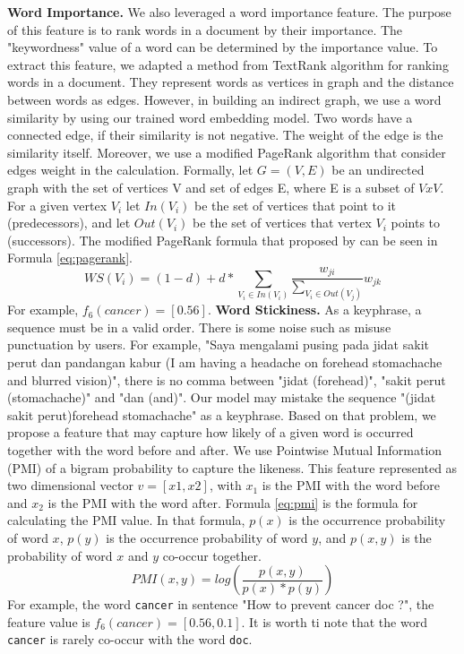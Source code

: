     \textbf{Word Importance.} We also leveraged a word importance feature. The purpose of this feature is to rank words in a document by their importance. The "keywordness" value of a word can be determined by the importance value. To extract this feature, we adapted a method from TextRank \cite{mihalcea2004textrank} algorithm for ranking words in a document. They represent words as vertices in graph and the distance between words as edges. However, in building an indirect graph, we use a word similarity by using our trained word embedding model. Two words have a connected edge, if their similarity is not negative. The weight of the edge is the similarity itself. Moreover, we use a modified PageRank \cite{page1999pagerank} algorithm that consider edges weight in the calculation. Formally, let $G = (V, E)$ be an undirected graph with the set of vertices V and set of edges E, where E is a subset of $VxV$. For a given vertex $V_i$ let $In(V_i)$ be the set of vertices that point to it (predecessors), and let $Out(V_i)$ be the set of vertices that vertex $V_i$ points to (successors). The modified PageRank formula that proposed by \cite{mihalcea2004textrank} can be seen in Formula \ref{eq:pagerank}.
        \begin{equation}\label{eq:pagerank}
        	WS(V_{i})=(1-d) + d * \sum_{V_{i} \in In(V_{i})} \frac{w_{ji}}{\sum_{V_{i} \in Out(V_{j})}}w_{jk}
        \end{equation}
    For example, $f_6(cancer) = [0.56]$.
    \textbf{Word Stickiness.} As a keyphrase, a sequence must be in a valid order. There is some noise such as misuse punctuation by users. For example, "Saya mengalami pusing pada jidat sakit perut dan pandangan kabur (I am having a headache on forehead stomachache and blurred vision)", there is no comma between "jidat (forehead)", "sakit perut (stomachache)" and "dan (and)". Our model may mistake the sequence "(jidat sakit perut)forehead stomachache" as a keyphrase. Based on that problem, we propose a feature that may capture how likely of a given word is occurred together with the word before and after. We use Pointwise Mutual Information (PMI) of a bigram probability to capture the likeness. This feature represented as two dimensional vector $v = [x1, x2]$, with $x_1$ is the PMI with the word before and $x_2$ is the PMI with the word after. Formula \ref{eq:pmi} is the formula for calculating the PMI value. In that formula, $p(x)$ is the occurrence probability of word $x$, $p(y)$ is the occurrence probability of word $y$, and $p(x, y)$ is the probability of word $x$ and $y$ co-occur together.
    \begin{equation}\label{eq:pmi}
	    PMI(x,y)=log(\frac{p(x, y)}{p(x)*p(y)})
    \end{equation}
    For example, the word \texttt{cancer} in sentence "How to prevent cancer doc ?", the feature value is $f_6(cancer) = [0.56, 0.1]$. It is worth ti note that the word \texttt{cancer} is rarely co-occur with the word \texttt{doc}.


